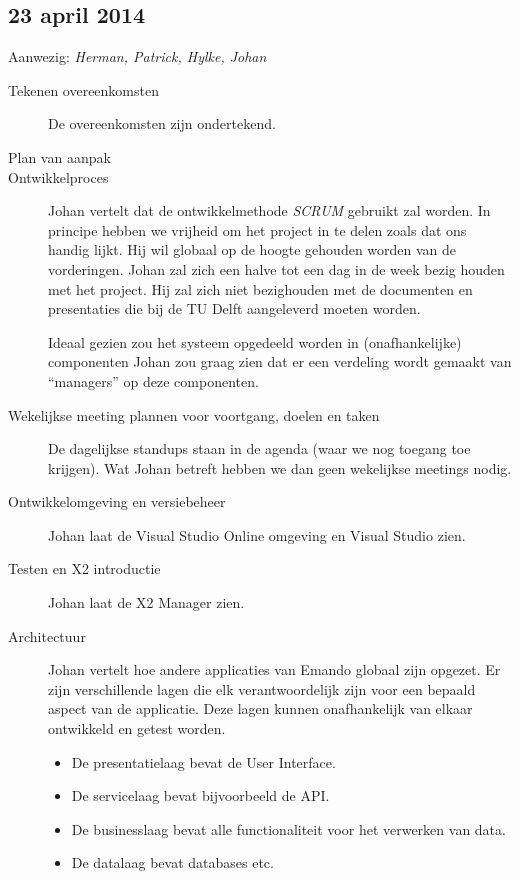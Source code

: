 \subsection*{23 april 2014}
\label{sec:meeting-23-apr}

Aanwezig: \textit{Herman, Patrick, Hylke, Johan}

\begin{description}
\item[Tekenen overeenkomsten] De overeenkomsten zijn ondertekend.

\item[Plan van aanpak] 

\item[Ontwikkelproces] Johan vertelt dat de ontwikkelmethode \textit{SCRUM} gebruikt zal worden. In principe hebben we vrijheid om het project in te delen zoals dat ons handig lijkt. Hij wil globaal op de hoogte gehouden worden van de vorderingen. Johan zal zich een halve tot een dag in de week bezig houden met het project. Hij zal zich niet bezighouden met de documenten en presentaties die bij de TU Delft aangeleverd moeten worden.

Ideaal gezien zou het systeem opgedeeld worden in (onafhankelijke) componenten Johan zou graag zien dat er een verdeling wordt gemaakt van ``managers'' op deze componenten.

\item[Wekelijkse meeting plannen voor voortgang, doelen en taken] De dagelijkse standups staan in de agenda (waar we nog toegang toe krijgen). Wat Johan betreft hebben we dan geen wekelijkse meetings nodig.

\item[Ontwikkelomgeving en versiebeheer] Johan laat de Visual Studio Online omgeving en Visual Studio zien.

\item[Testen en \mylaps X2 introductie] Johan laat de \mylaps X2 Manager zien.

\item[Architectuur] Johan vertelt hoe andere applicaties van Emando globaal zijn opgezet. Er zijn verschillende lagen die elk verantwoordelijk zijn voor een bepaald aspect van de applicatie. Deze lagen kunnen onafhankelijk van elkaar ontwikkeld en getest worden.

\begin{itemize}
  \item De presentatielaag bevat de User Interface.
  \item De servicelaag bevat bijvoorbeeld de API.
  \item De businesslaag bevat alle functionaliteit voor het verwerken van data.
  \item De datalaag bevat databases etc.
\end{itemize}

\end{description}

